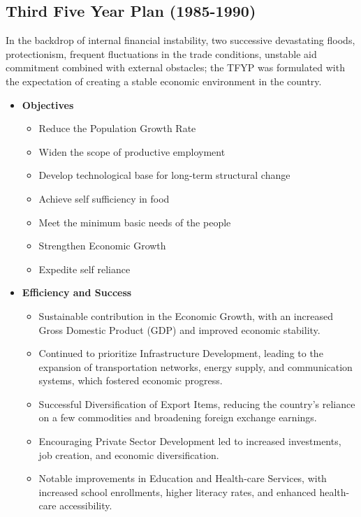 \subsection{Third Five Year Plan (1985-1990)}
In the backdrop of internal financial instability, two successive devastating floods, 
protectionism, frequent fluctuations in the trade conditions, unstable aid commitment 
combined with external obstacles; the TFYP was formulated with the expectation of 
creating a stable economic environment in the country.

\begin{itemize}
	\item\textbf{Objectives}
	\begin{itemize}
		\item Reduce the Population Growth Rate
		\item Widen the scope of productive employment
		\item Develop technological base for long-term structural change
		\item Achieve self sufficiency in food
		\item Meet the minimum basic needs of the people
		\item Strengthen Economic Growth
		\item Expedite self reliance
	\end{itemize}
	
	\item\textbf{Efficiency and Success}
	\begin{itemize}
		\item Sustainable contribution in the Economic Growth, 
		with an increased Gross Domestic Product (GDP) and improved economic stability.
		\item Continued to prioritize Infrastructure Development, leading to the expansion 
		of transportation networks, energy supply, and communication systems, which fostered economic progress.
		\item Successful Diversification of Export Items, reducing the country's reliance on 
		a few commodities and broadening foreign exchange earnings.
		\item Encouraging Private Sector Development led to increased investments, 
		job creation, and economic diversification.
		\item Notable improvements in Education and Health-care Services, with increased school enrollments, 
		higher literacy rates, and enhanced health-care accessibility.
	\end{itemize}
	

\end{itemize}
